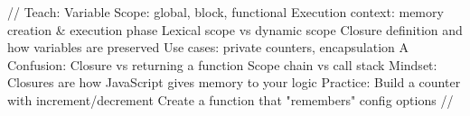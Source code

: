 //
Teach:
Variable Scope: global, block, functional
Execution context: memory creation & execution phase
Lexical scope vs dynamic scope
Closure definition and how variables are preserved
Use cases: private counters, encapsulation
A Confusion:
Closure vs returning a function
Scope chain vs call stack
Mindset:
Closures are how JavaScript gives memory to your logic
Practice:
Build a counter with increment/decrement
Create a function that "remembers" config options //

